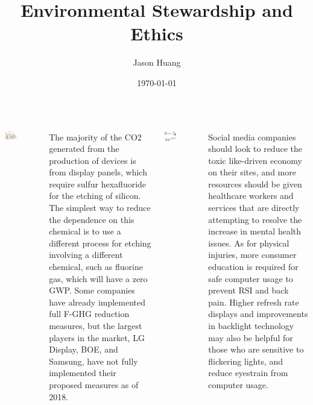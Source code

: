\documentclass[a1paper, 25pt]{tikzposter}
\title{Environmental Stewardship and Ethics}
\author{Jason Huang}
\date{\today}
\institute{ICS4U0 @ John Fraser Secondary School}
\begin{document}
\maketitle

\begin{columns}
   {
    \begin{tikzfigure}
      \includegraphics[width=0.4\textwidth]{images/environment.png}
    \end{tikzfigure}
    The majority of the CO2 generated from the production of devices is from display panels, which require sulfur hexafluoride for the etching of silicon. The simplest way to reduce the dependence on this chemical is to use a different process for etching involving a different chemical, such as fluorine gas, which will have a zero GWP. Some companies have already implemented full F-GHG reduction measures, but the largest players in the market, LG Display, BOE, and Samsung, have not fully implemented their proposed measures as of 2018.
  }

   {
    \begin{tikzfigure}
      \includegraphics[width=0.4\textwidth]{images/health.png}
    \end{tikzfigure}
    Social media companies should look to reduce the toxic like-driven economy on their sites, and more resources should be given healthcare workers and services that are directly attempting to resolve the increase in mental health issues. As for physical injuries, more consumer education is required for safe computer usage to prevent RSI and back pain. Higher refresh rate displays and improvements in backlight technology may also be helpful for those who are sensitive to flickering lights, and reduce eyestrain from computer usage.
  }
\end{columns}
\end{document}
